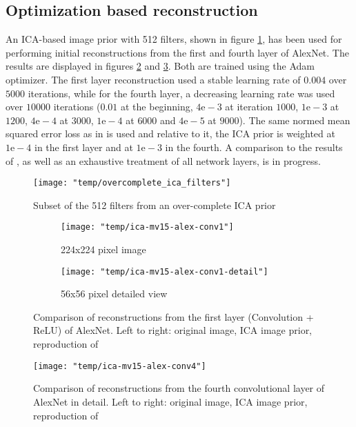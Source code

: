 \documentclass{article}
\begin{document}
\subsection{Optimization based reconstruction}

An ICA-based image prior with 512 filters, shown in figure \ref{fig:first_ica_filters}, has been used for performing initial reconstructions from the first and fourth layer of AlexNet. The results are displayed in figures \ref{fig:ica_mv_l1} and \ref{fig:ica_mv_l4}. Both are trained using the Adam optimizer. The first layer reconstruction used a stable learning rate of $0.004$ over $5000$ iterations, while for the fourth layer, a decreasing learning rate was used over $10000$ iterations ($0.01$ at the beginning, $4\mathrm{e-}3$ at iteration $1000$, $1\mathrm{e-}3$ at $1200$, $4\mathrm{e-}4$ at $3000$, $1\mathrm{e-}4$ at $6000$ and $4\mathrm{e-}5$ at $9000$). The same normed mean squared error loss as in \cite{mv15} is used and relative to it, the ICA prior is weighted at $1\mathrm{e-}4$ in the first layer and at $1\mathrm{e-}3$ in the fourth. A comparison to the results of \cite{mv16}, as well as an exhaustive treatment of all network layers, is in progress.

\begin{figure}
	\centering
	\texttt{[image: "temp/overcomplete\_ica\_filters"]}
	\caption{Subset of the 512 filters from an over-complete ICA prior}
	\label{fig:first_ica_filters}
\end{figure}


\begin{figure}
	\centering
	\begin{subfigure}[b]{\textwidth}
		\centering
		\texttt{[image: "temp/ica-mv15-alex-conv1"]}
		\caption{224x224 pixel image}
	\end{subfigure}
	
	\begin{subfigure}[b]{\textwidth}
		\centering
		\texttt{[image: "temp/ica-mv15-alex-conv1-detail"]}
		\caption{56x56 pixel detailed view}
	\end{subfigure}
	\caption{Comparison of reconstructions from the first layer (Convolution + ReLU) of AlexNet. Left to right: original image, ICA image prior, reproduction of \cite{mv15}}
	\label{fig:ica_mv_l1}
\end{figure}

\begin{figure}
	\centering
	\texttt{[image: "temp/ica-mv15-alex-conv4"]}
	\caption{Comparison of reconstructions from the fourth convolutional layer of AlexNet in detail. Left to right: original image, ICA image prior, reproduction of \cite{mv15}}
	\label{fig:ica_mv_l4}
\end{figure}
\end{document}
